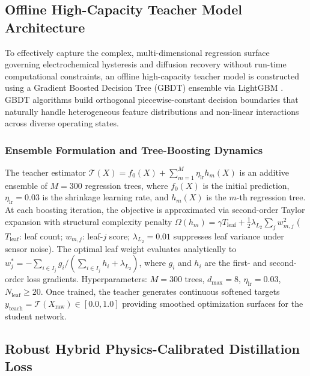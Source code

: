 \subsection{Offline High-Capacity Teacher Model Architecture}
\label{sec:meth_b}

To effectively capture the complex, multi-dimensional regression surface governing electrochemical hysteresis and diffusion recovery without run-time computational constraints, an offline high-capacity teacher model is constructed using a Gradient Boosted Decision Tree (GBDT) ensemble via LightGBM \cite{ke2017lightgbm}. GBDT algorithms build orthogonal piecewise-constant decision boundaries that naturally handle heterogeneous feature distributions and non-linear interactions across diverse operating states.

\subsubsection{Ensemble Formulation and Tree-Boosting Dynamics}
The teacher estimator $\mathcal{T}(X) = f_0(X) + \sum_{m=1}^{M} \eta_{\text{lr}} h_m(X)$ is an additive ensemble of $M = 300$ regression trees, where $f_0(X)$ is the initial prediction, $\eta_{\text{lr}} = 0.03$ is the shrinkage learning rate, and $h_m(X)$ is the $m$-th regression tree. At each boosting iteration, the objective is approximated via second-order Taylor expansion with structural complexity penalty $\Omega(h_m) = \gamma T_{\text{leaf}} + \frac{1}{2}\lambda_{L_2}\sum_j w_{m,j}^2$ ($T_{\text{leaf}}$: leaf count; $w_{m,j}$: leaf-$j$ score; $\lambda_{L_2} = 0.01$ suppresses leaf variance under sensor noise). The optimal leaf weight evaluates analytically to $w_j^* = -\sum_{i \in I_j} g_i / (\sum_{i \in I_j} h_i + \lambda_{L_2})$, where $g_i$ and $h_i$ are the first- and second-order loss gradients. Hyperparameters: $M = 300$ trees, $d_{\max} = 8$, $\eta_{\text{lr}} = 0.03$, $N_{\text{leaf}} \ge 20$. Once trained, the teacher generates continuous softened targets $y_{\text{teach}} = \mathcal{T}(X_{\text{raw}}) \in [0.0, 1.0]$ providing smoothed optimization surfaces for the student network.

\subsection{Robust Hybrid Physics-Calibrated Distillation Loss}
\label{sec:meth_c}

